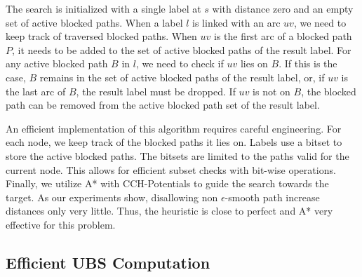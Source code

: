 \documentclass[a4paper,UKenglish,cleveref, autoref, thm-restate]{lipics-v2021}
\begin{document}
The search is initialized with a single label at $s$ with distance zero and an empty set of active blocked paths.
When a label $l$ is linked with an arc $uv$, we need to keep track of traversed blocked paths.
When $uv$ is the first arc of a blocked path $P$, it needs to be added to the set of active blocked paths of the result label.
For any active blocked path $B$ in $l$, we need to check if $uv$ lies on $B$.
If this is the case, $B$ remains in the set of active blocked paths of the result label, or, if $uv$ is the last arc of $B$, the result label must be dropped.
If $uv$ is not on $B$, the blocked path can be removed from the active blocked path set of the result label.

An efficient implementation of this algorithm requires careful engineering.
For each node, we keep track of the blocked paths it lies on.
Labels use a bitset to store the active blocked paths.
The bitsets are limited to the paths valid for the current node.
This allows for efficient subset checks with bit-wise operations.
Finally, we utilize A* with CCH-Potentials to guide the search towards the target.
As our experiments show, disallowing non $\epsilon$-smooth path increase distances only very little.
Thus, the heuristic is close to perfect and A* very effective for this problem.

\subsection{Efficient UBS Computation}\label{sec:ubs_tree}
\end{document}
